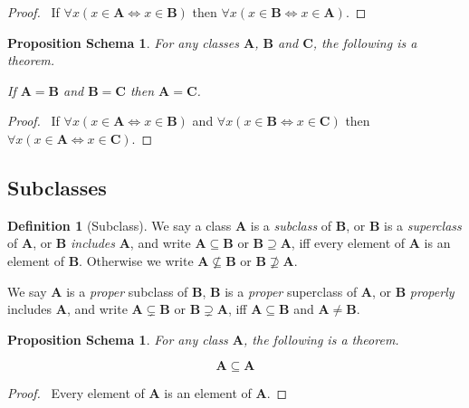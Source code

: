 \documentclass{book}
\let\qed\relax
\newtheorem{props}[ax]{Proposition Schema}
\theoremstyle{definition}
\newtheorem{df}[ax]{Definition}
\begin{document}
\begin{proof}
\pf\ If $\forall x (x \in \mathbf{A} \Leftrightarrow x \in \mathbf{B})$ then $\forall x (x \in \mathbf{B} \Leftrightarrow x \in \mathbf{A})$. \qed
\end{proof}

\begin{props}
For any classes $\mathbf{A}$, $\mathbf{B}$ and $\mathbf{C}$, the following is a theorem.

If $\mathbf{A} = \mathbf{B}$ and $\mathbf{B} = \mathbf{C}$ then $\mathbf{A} = \mathbf{C}$.
\end{props}

\begin{proof}
\pf\ If $\forall x (x \in \mathbf{A} \Leftrightarrow x \in \mathbf{B})$ and $\forall x (x \in \mathbf{B} \Leftrightarrow x \in \mathbf{C})$ then $\forall x (x \in \mathbf{A} \Leftrightarrow x \in \mathbf{C})$. \qed
\end{proof}

\subsection{Subclasses}

\begin{df}[Subclass]
We say a class $\mathbf{A}$ is a \emph{subclass} of $\mathbf{B}$, or $\mathbf{B}$ is a \emph{superclass} of $\mathbf{A}$, or $\mathbf{B}$ \emph{includes} $\mathbf{A}$, and write $\mathbf{A} \subseteq \mathbf{B}$ or $\mathbf{B} \supseteq \mathbf{A}$, iff every element of $\mathbf{A}$ is an element of $\mathbf{B}$. Otherwise we write $\mathbf{A} \nsubseteq \mathbf{B}$ or $\mathbf{B} \nsupseteq \mathbf{A}$.

We say $\mathbf{A}$ is a \emph{proper} subclass of $\mathbf{B}$, $\mathbf{B}$ is a \emph{proper} superclass of $\mathbf{A}$, or $\mathbf{B}$ \emph{properly} includes $\mathbf{A}$, and write $\mathbf{A} \subsetneq \mathbf{B}$ or $\mathbf{B} \supsetneq \mathbf{A}$, iff $\mathbf{A} \subseteq \mathbf{B}$ and $\mathbf{A} \neq \mathbf{B}$.
\end{df}

\begin{props}
For any class $\mathbf{A}$, the following is a theorem.

\[ \mathbf{A} \subseteq \mathbf{A} \]
\end{props}

\begin{proof}
\pf\ Every element of $\mathbf{A}$ is an element of $\mathbf{A}$. \qed
\end{proof}
\end{document}
